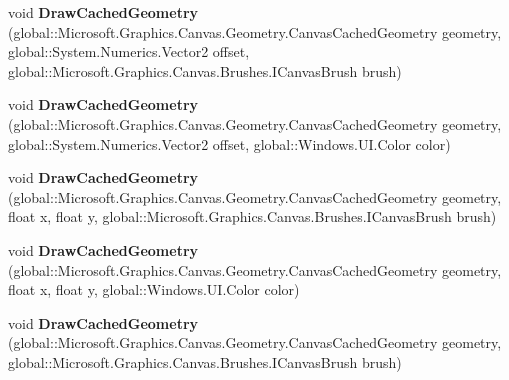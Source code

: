 \begin{DoxyCompactItemize}
\mbox{\label{interface_microsoft_1_1_graphics_1_1_canvas_1_1_i_canvas_drawing_session_a418504f456b041d0ddb6925d59602988}} 
void {\bfseries Draw\+Cached\+Geometry} (global\+::\+Microsoft.\+Graphics.\+Canvas.\+Geometry.\+Canvas\+Cached\+Geometry geometry, global\+::\+System.\+Numerics.\+Vector2 offset, global\+::\+Microsoft.\+Graphics.\+Canvas.\+Brushes.\+I\+Canvas\+Brush brush)
\item 
\mbox{\label{interface_microsoft_1_1_graphics_1_1_canvas_1_1_i_canvas_drawing_session_a449b80d289024fe83fd023fd4cc3fcdb}} 
void {\bfseries Draw\+Cached\+Geometry} (global\+::\+Microsoft.\+Graphics.\+Canvas.\+Geometry.\+Canvas\+Cached\+Geometry geometry, global\+::\+System.\+Numerics.\+Vector2 offset, global\+::\+Windows.\+U\+I.\+Color color)
\item 
\mbox{\label{interface_microsoft_1_1_graphics_1_1_canvas_1_1_i_canvas_drawing_session_a597dda2fab070afb198c2709fb7b5ed8}} 
void {\bfseries Draw\+Cached\+Geometry} (global\+::\+Microsoft.\+Graphics.\+Canvas.\+Geometry.\+Canvas\+Cached\+Geometry geometry, float x, float y, global\+::\+Microsoft.\+Graphics.\+Canvas.\+Brushes.\+I\+Canvas\+Brush brush)
\item 
\mbox{\label{interface_microsoft_1_1_graphics_1_1_canvas_1_1_i_canvas_drawing_session_adc98a57b53e38c02cfbdeb5b862f5355}} 
void {\bfseries Draw\+Cached\+Geometry} (global\+::\+Microsoft.\+Graphics.\+Canvas.\+Geometry.\+Canvas\+Cached\+Geometry geometry, float x, float y, global\+::\+Windows.\+U\+I.\+Color color)
\item 
\mbox{\label{interface_microsoft_1_1_graphics_1_1_canvas_1_1_i_canvas_drawing_session_a8c31d29ae29bf7dc92f38fdc9c587ca8}} 
void {\bfseries Draw\+Cached\+Geometry} (global\+::\+Microsoft.\+Graphics.\+Canvas.\+Geometry.\+Canvas\+Cached\+Geometry geometry, global\+::\+Microsoft.\+Graphics.\+Canvas.\+Brushes.\+I\+Canvas\+Brush brush)
\item 
\mbox{\label{interface_microsoft_1_1_graphics_1_1_canvas_1_1_i_canvas_drawing_session_a5826731e945620d3a135bfbbc8540c12}} 

\end{DoxyCompactItemize}
